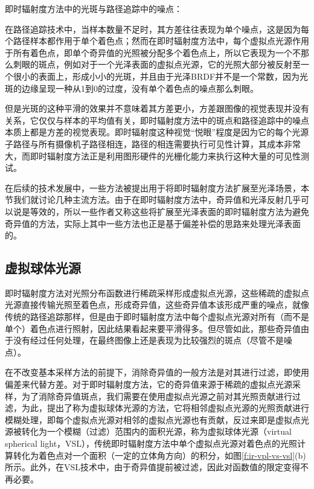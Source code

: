 \begin{myshaded}
	\indent 即时辐射度方法中的光斑与路径追踪中的噪点：
	
	\indent 在路径追踪技术中，当样本数量不足时，其方差往往表现为单个噪点，这是因为每个路径样本都作用于单个着色点；然而在即时辐射度方法中，每个虚拟点光源作用于所有着色点，即单个奇异值的光照被分配多个着色点上，所以它表现为一个不那么刺眼的斑点，例如对于一个光泽表面的虚拟点光源，它的光照大部分被反射至一个很小的表面上，形成小小的光斑，并且由于光泽BRDF并不是一个常数，因为光斑的边缘呈现一种从1到0的过度，没有单个着色点的噪点那么刺眼。
	
	\indent 但是光斑的这种平滑的效果并不意味着其方差更小，方差跟图像的视觉表现并没有关系，它仅仅与样本的平均值有关，即时辐射度方法中的斑点和路径追踪中的噪点本质上都是方差的视觉表现。即时辐射度这种视觉“悦眼”程度是因为它的每个光源子路径与所有摄像机子路径相连，路径的相连需要执行可见性计算，其成本非常大，而即时辐射度方法正是利用图形硬件的光栅化能力来执行这种大量的可见性测试。
\end{myshaded}

在后续的技术发展中，一些方法被提出用于将即时辐射度方法扩展至光泽场景，本节我们就讨论几种主流方法。由于在即时辐射度方法中，奇异值和光泽反射几乎可以说是等效的，所以一些作者又称这些将扩展至光泽表面的即时辐射度方法为避免奇异值的方法，实际上其中一些方法也正是基于偏差补偿的思路来处理光泽表面的。




\subsection{虚拟球体光源}
即时辐射度方法对光照分布函数进行稀疏采样形成虚拟点光源，这些稀疏的虚拟点光源直接传输光照至着色点，形成奇异值，这些奇异值本该形成严重的噪点，就像传统的路径追踪那样，但是由于即时辐射度方法中每个虚拟点光源对所有（而不是单个）着色点进行照射，因此结果看起来要平滑得多。但尽管如此，那些奇异值由于没有经过任何处理，在最终图像上还是表现为比较强烈的斑点（尽管不是噪点）。

在不改变基本采样方法的前提下，消除奇异值的一般方法是对其进行过滤，即使用偏差来代替方差。对于即时辐射度方法，它的奇异值来源于稀疏的虚拟点光源采样，为了消除奇异值斑点，我们需要在使用虚拟点光源之前对其光照贡献进行过滤，为此，\cite{a:VirtualSphericalLightsforMany-LightRenderingofGlossyScenes}提出了称为虚拟球体光源的方法，它将相邻虚拟点光源的光照贡献进行模糊处理，即每个虚拟点光源对相邻的虚拟点光源也有贡献，反过来即是虚拟点光源被转化为一个模糊（过滤）范围内的面积光源，称为虚拟球体光源（virtual spherical light，VSL），传统即时辐射度方法中单个虚拟点光源对着色点的光照计算转化为着色点对一个面积（一定的立体角方向）的积分，如图\ref{f:ir-vpl-vs-vsl}(b)所示。此外，在VSL技术中，由于奇异值提前被过滤，因此对函数值的限定变得不再必要。

